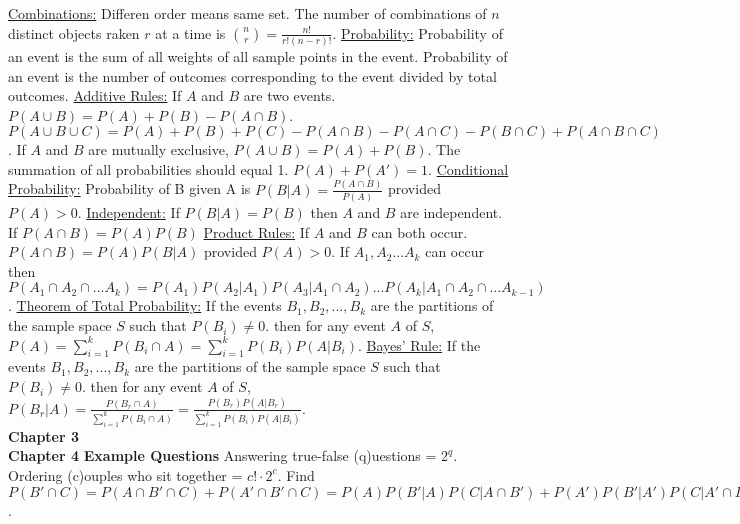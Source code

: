 \documentclass[9pt]{article}
\begin{document}
        \underline{Combinations:} Differen order means same set. The number of combinations of $n$ distinct objects raken $r$ at a time is $\binom{n}{r} = \frac{n!}{r!(n-r)!}$.
        \underline{Probability:} Probability of an event is the sum of all weights of all sample points in the event. Probability of an event is the number of outcomes corresponding to the event divided by total outcomes.
        \underline{Additive Rules:} If $A$ and $B$ are two events. $P(A\cup B) = P(A) + P(B) - P(A\cap B)$. $P(A\cup B\cup C) = P(A)+P(B)+P(C)-P(A\cap B) - P(A\cap C) - P(B\cap C) + P(A\cap B\cap C)$. If $A$ and $B$ are mutually exclusive, $P(A\cup B) = P(A) + P(B)$. The summation of all probabilities should equal 1. $P(A) + P(A') = 1$.
        \underline{Conditional Probability:} Probability of B given A is $P(B|A)=\frac{P(A\cap B)}{P(A)}$ provided $P(A) > 0$.
        \underline{Independent:} If $P(B|A) = P(B)$ then $A$ and $B$ are independent. If $P(A\cap B)=P(A)P(B)$
        \underline{Product Rules:} If $A$ and $B$ can both occur. $P(A\cap B) = P(A)P(B|A)$ provided $P(A)>0$. If $A_1,A_2...A_k$ can occur then $P(A_1\cap A_2\cap ... A_k) = P(A_1)P(A_2|A_1)P(A_3|A_1\cap A_2)...P(A_k|A_1\cap A_2\cap ... A_{k-1})$.
        \underline{Theorem of Total Probability:} If the events $B_1, B_2,...,B_k$ are the partitions of the sample space $S$ such that $P(B_i)\not= 0$. then for any event $A$ of $S$, $P(A)=\sum_{i=1}^{k}P(B_i\cap A)=\sum_{i=1}^{k}P(B_i)P(A|B_i)$.
        \underline{Bayes' Rule:} If the events $B_1, B_2,...,B_k$ are the partitions of the sample space $S$ such that $P(B_i)\not= 0$. then for any event $A$ of $S$, $P(B_r|A) = \frac{P(B_r\cap A)}{\sum_{i=1}^{k}P(B_i\cap A)} = \frac{P(B_r)P(A|B_r)}{\sum_{i=1}^{k}P(B_i)P(A|B_i)}$.
    \\
    \noindent\textbf{Chapter 3}
    \\
    \noindent\textbf{Chapter 4}
    \noindent\textbf{Example Questions} 
        Answering true-false (q)uestions = $2^{q}$.
        Ordering (c)ouples who sit together = $c!\cdot 2^c$.
        Find $P(B'\cap C) = P(A\cap B'\cap C)+P(A'\cap B'\cap C) = P(A)P(B'|A)P(C|A\cap B') + P(A')P(B'|A')P(C|A'\cap B')$.
\end{document}
